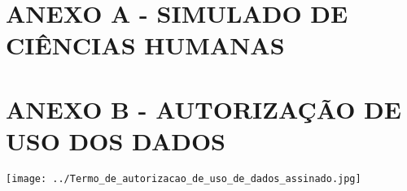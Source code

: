 
\chapter*{ANEXO A - SIMULADO DE CIÊNCIAS HUMANAS}


\chapter*{ANEXO B - AUTORIZAÇÃO DE USO DOS DADOS}


\newpage
\thispagestyle{empty} %
\hspace{-4cm}%
\texttt{[image: ../Termo\_de\_autorizacao\_de\_uso\_de\_dados\_assinado.jpg]}
%

\begin{comment}
\begin{anexosenv}
	
	\chapter{}
	
	\addcontentsline{toc}{chapter}{\hspace{4.94em}ANEXO A - Itens do simulado}
	
	
	
\end{anexosenv}
\end{comment}

